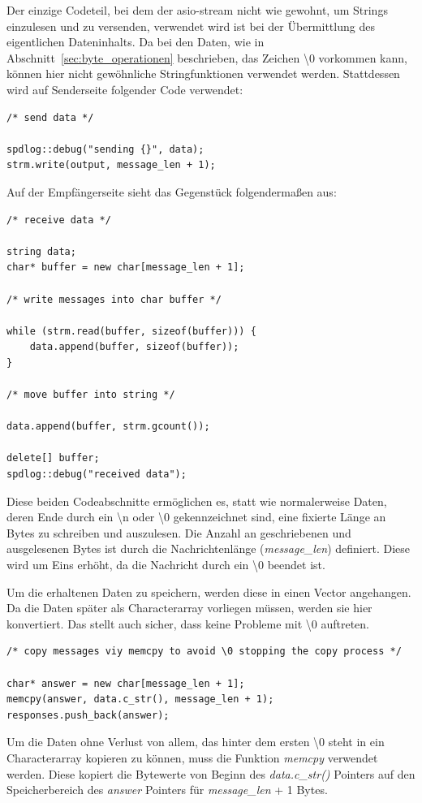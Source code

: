 \documentclass[]{article}
\begin{document}
Der einzige Codeteil, bei dem der asio-stream nicht wie gewohnt, um Strings einzulesen und zu versenden, verwendet wird ist bei der Übermittlung des eigentlichen Dateninhalts. Da bei den Daten, wie in Abschnitt~\ref{sec:byte_operationen} beschrieben, das Zeichen \textbackslash 0 vorkommen kann, können hier nicht gewöhnliche Stringfunktionen verwendet werden. Stattdessen wird auf Senderseite folgender Code verwendet:

\begin{lstlisting}
/* send data */

spdlog::debug("sending {}", data);
strm.write(output, message_len + 1);
\end{lstlisting}

Auf der Empfängerseite sieht das Gegenstück folgendermaßen aus:

\begin{lstlisting}
/* receive data */

string data;
char* buffer = new char[message_len + 1];

/* write messages into char buffer */

while (strm.read(buffer, sizeof(buffer))) {
	data.append(buffer, sizeof(buffer));
}

/* move buffer into string */

data.append(buffer, strm.gcount());

delete[] buffer;
spdlog::debug("received data");
\end{lstlisting}

Diese beiden Codeabschnitte ermöglichen es, statt wie normalerweise Daten, deren Ende durch ein \textbackslash n oder \textbackslash 0 gekennzeichnet sind, eine fixierte Länge an Bytes zu schreiben und auszulesen. Die Anzahl an geschriebenen und ausgelesenen Bytes ist durch die Nachrichtenlänge (\textit{message\_len}) definiert. Diese wird um Eins erhöht, da die Nachricht durch ein \textbackslash 0 beendet ist.

Um die erhaltenen Daten zu speichern, werden diese in einen Vector angehangen. Da die Daten später als Characterarray vorliegen müssen, werden sie hier konvertiert. Das stellt auch sicher, dass keine Probleme mit \textbackslash 0 auftreten.

\begin{lstlisting}
/* copy messages viy memcpy to avoid \0 stopping the copy process */

char* answer = new char[message_len + 1];
memcpy(answer, data.c_str(), message_len + 1);
responses.push_back(answer);
\end{lstlisting}

Um die Daten ohne Verlust von allem, das hinter dem ersten \textbackslash 0 steht in ein Characterarray kopieren zu können, muss die Funktion \textit{memcpy} verwendet werden. Diese kopiert die Bytewerte von Beginn des \textit{data.c\_str()} Pointers auf den Speicherbereich des \textit{answer} Pointers für \textit{message\_len} + 1 Bytes.
\end{document}
